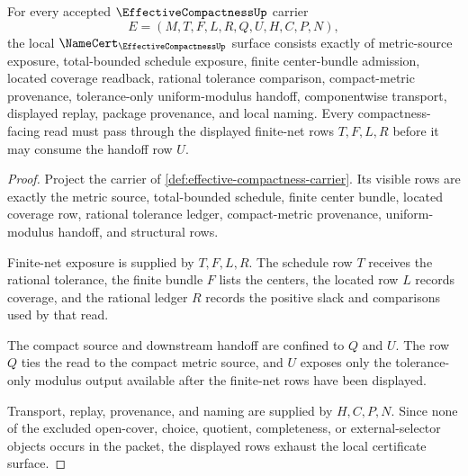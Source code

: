 \begin{theorem}
\label{thm:effective-compactness-namecert-obligations}
For every accepted $\EffectiveCompactnessUp$ carrier
$$
E=(M,T,F,L,R,Q,U,H,C,P,N),
$$
the local $\NameCert_{\EffectiveCompactnessUp}$ surface consists exactly of metric-source exposure, total-bounded schedule exposure, finite center-bundle admission, located coverage readback, rational tolerance comparison, compact-metric provenance, tolerance-only uniform-modulus handoff, componentwise transport, displayed replay, package provenance, and local naming. Every compactness-facing read must pass through the displayed finite-net rows $T,F,L,R$ before it may consume the handoff row $U$.
\end{theorem}
\begin{proof}
Project the carrier of \autoref{def:effective-compactness-carrier}. Its visible rows are exactly the metric source, total-bounded schedule, finite center bundle, located coverage row, rational tolerance ledger, compact-metric provenance, uniform-modulus handoff, and structural rows.

Finite-net exposure is supplied by $T,F,L,R$. The schedule row $T$ receives the rational tolerance, the finite bundle $F$ lists the centers, the located row $L$ records coverage, and the rational ledger $R$ records the positive slack and comparisons used by that read.

The compact source and downstream handoff are confined to $Q$ and $U$. The row $Q$ ties the read to the compact metric source, and $U$ exposes only the tolerance-only modulus output available after the finite-net rows have been displayed.

Transport, replay, provenance, and naming are supplied by $H,C,P,N$. Since none of the excluded open-cover, choice, quotient, completeness, or external-selector objects occurs in the packet, the displayed rows exhaust the local certificate surface.
\end{proof}

